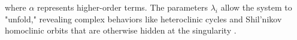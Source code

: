 \documentclass[12pt, a4paper, oneside]{book}
\theoremstyle{plain}
\theoremstyle{definition}
\theoremstyle{remark}
\theoremstyle{definition}
\begin{document}
where $\alpha$ represents higher-order terms. The parameters $\lambda_i$ allow the system to "unfold," revealing complex behaviors like heteroclinic cycles and Shil’nikov homoclinic orbits that are otherwise hidden at the singularity \cite{ibanez2005shil}.

\end{document}
